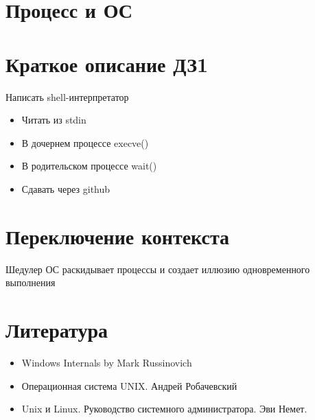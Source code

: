 \documentclass[../lectures.tex]{subfiles}
\begin{document}
\section{Процесс и ОС}

\section{Краткое описание ДЗ1} 
Написать shell-интерпретатор
\begin{itemize}
    \item Читать из stdin 
    \item В дочернем процессе execve()
    \item В родительском процессе wait()
    \item Сдавать через github
\end{itemize}

\section{Переключение контекста}
Шедулер ОС раскидывает процессы и создает иллюзию одновременного выполнения

\section{Литература}
\begin{itemize}
    \item Windows Internals by Mark Russinovich
    \item Операционная система UNIX. Андрей Робачевский
    \item Unix и Linux. Руководство системного администратора. Эви Немет.
\end{itemize}

 
 
 

\end{document}
